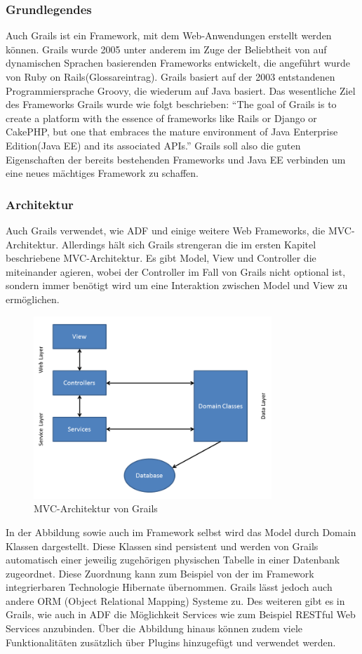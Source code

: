 \subsubsection{Grundlegendes}
Auch Grails ist ein Framework, mit dem Web-Anwendungen erstellt werden können. Grails wurde 2005 unter anderem im Zuge der Beliebtheit von auf dynamischen Sprachen basierenden Frameworks entwickelt, die angeführt wurde von Ruby on Rails(Glossareintrag). Grails basiert auf der 2003 entstandenen Programmiersprache Groovy, die wiederum auf Java basiert. Das wesentliche Ziel des Frameworks Grails wurde wie folgt beschrieben: "`The goal of Grails is to create a platform with the essence of frameworks like Rails or Django or CakePHP, but one that embraces the mature environment of Java Enterprise Edition(Java EE) and its associated APIs."' Grails soll also die guten Eigenschaften der bereits bestehenden Frameworks und Java EE verbinden um eine neues mächtiges Framework zu schaffen.

\subsubsection{Architektur}
Auch Grails verwendet, wie ADF und einige weitere Web Frameworks, die MVC-Architektur. Allerdings hält sich Grails strengeran die im ersten Kapitel beschriebene MVC-Architektur. Es gibt Model, View und Controller die miteinander agieren, wobei der Controller im Fall von Grails nicht optional ist, sondern immer benötigt wird um eine Interaktion zwischen Model und View zu ermöglichen.\\
\begin{figure}[H]
\centering
\includegraphics[width=0.80\textwidth]{img/Folie1.png}
\caption {MVC-Architektur von Grails}
\end{figure}
In der Abbildung sowie auch im Framework selbst wird das Model durch Domain Klassen dargestellt. Diese Klassen sind persistent und werden von Grails automatisch einer jeweilig zugehörigen physischen Tabelle in einer Datenbank zugeordnet. Diese Zuordnung kann zum Beispiel von der im Framework integrierbaren Technologie Hibernate übernommen. Grails lässt jedoch auch andere ORM (Object Relational Mapping) Systeme zu. Des weiteren gibt es in Grails, wie auch in ADF die Möglichkeit Services wie zum Beispiel RESTful Web Services anzubinden. Über die Abbildung hinaus können zudem viele Funktionalitäten zusätzlich über Plugins hinzugefügt und verwendet werden.\\

